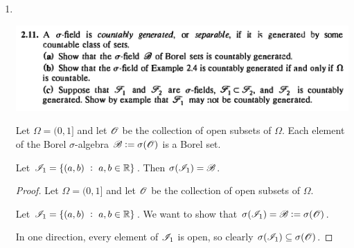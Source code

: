 \begin{enumerate}
\begin{enumerate}[label=(\alph*)]
\begin{proof}
      It follows from induction that $\ms B$ is closed under finite intersections.

      Finally we show that $\ms B$ is closed under complements. As before,
      let $B = \bigcup_{i=1}^m \bigcap_{j=1}^{n_i} A_{ij}$, where either $A_{ij} \in \ms A$
      or $A^c_{ij} \in \ms A$. Then
      \begin{align*}
        B^c
        &= \Big(\bigcup_{i=1}^m \bigcap_{j=1}^{n_i} A_{ij}\Big)^c \\
        &= \bigcap_{i=1}^m \bigcup_{j=1}^{n_i} A^c_{ij}.
      \end{align*}

       Why is this of the required form?
    \end{proof}

  \end{enumerate}
  \newpage
\item~\\
  \begin{mdframed}
    \includegraphics[width=400pt]{img/analysis--berkeley-202a-hw-fc85.png}
  \end{mdframed}
  \begin{definition*}
    Let $\Omega = (0, 1]$ and let $\mathscr O$ be the collection of open subsets of $\Omega$. Each element of the
    Borel $\sigma$-algebra $\mathscr B := \sigma(\mathscr O)$ is a Borel set.
  \end{definition*}

  \begin{lemma}\label{hw3-2-11-lemma-1}
    Let $\mathscr I_1 = \{(a, b) ~:~ a, b \in \mathbb{R}\}$. Then $\sigma(\mathscr I_1) = \mathscr B$.
  \end{lemma}
  \begin{proof}
    Let $\Omega = (0, 1]$ and let $\mathscr O$ be the collection of open subsets of $\Omega$.

    Let $\mathscr I_1 = \{(a, b) ~:~ a, b \in \mathbb{R}\}$. We want to show that $\sigma(\mathscr I_1) = \mathscr B := \sigma(\mathscr O)$.

    In one direction, every element of $\mathscr I_1$ is open, so clearly $\sigma(\mathscr I_1) \subseteq \sigma(\mathscr O)$.


\end{proof}
\end{enumerate}
